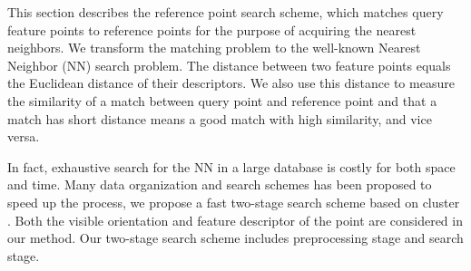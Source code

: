 This section describes the reference point search scheme, which matches query feature points to reference points for the purpose of acquiring the nearest neighbors. We transform the matching problem to the well-known Nearest Neighbor (NN) search problem.
The distance between two feature points equals the Euclidean distance of their descriptors.
We also use this distance to measure the similarity of a match between query point and reference point and that a match has short distance means a good match with high similarity, and vice versa.

In fact, exhaustive search for the NN in a large database is costly for both space and time. Many data organization and search schemes has been proposed to speed up the process, we propose a fast two-stage search scheme based on cluster \cite{gudmundsson2010large}. Both the visible orientation and feature descriptor of the point are considered in our method. Our two-stage search scheme includes preprocessing stage and search stage.
